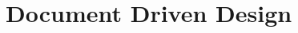 \documentclass{beamer}
\begin{document}








\section[DDD]{Document Driven Design}
\end{document}
